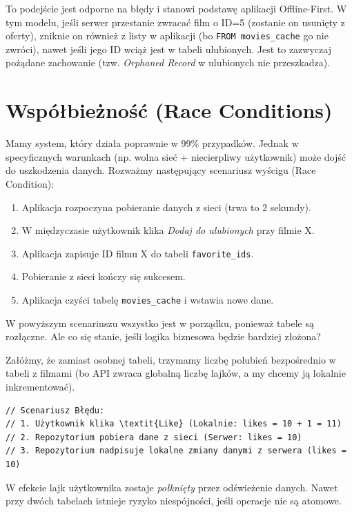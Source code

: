 To podejście jest odporne na błędy i stanowi podstawę aplikacji Offline-First. W tym modelu, jeśli serwer przestanie zwracać film o ID=5 (zostanie on usunięty z oferty), zniknie on również z listy w aplikacji (bo \texttt{FROM movies\_cache} go nie zwróci), nawet jeśli jego ID wciąż jest w tabeli ulubionych. Jest to zazwyczaj pożądane zachowanie (tzw. \textit{Orphaned Record} w ulubionych nie przeszkadza).

\section{Współbieżność (Race Conditions)}

Mamy system, który działa poprawnie w 99\% przypadków. Jednak w specyficznych warunkach (np. wolna sieć + niecierpliwy użytkownik) może dojść do uszkodzenia danych. Rozważmy następujący scenariusz wyścigu (Race Condition):

\begin{enumerate}
    \item Aplikacja rozpoczyna pobieranie danych z sieci (trwa to 2 sekundy).
    \item W międzyczasie użytkownik klika \textit{Dodaj do ulubionych} przy filmie X.
    \item Aplikacja zapisuje ID filmu X do tabeli \texttt{favorite\_ids}.
    \item Pobieranie z sieci kończy się sukcesem.
    \item Aplikacja czyści tabelę \texttt{movies\_cache} i wstawia nowe dane.
\end{enumerate}

W powyższym scenariuszu wszystko jest w porządku, ponieważ tabele są rozłączne. Ale co się stanie, jeśli logika biznesowa będzie bardziej złożona?

Załóżmy, że zamiast osobnej tabeli, trzymamy liczbę polubień bezpośrednio w tabeli z filmami (bo API zwraca globalną liczbę lajków, a my chcemy ją lokalnie inkrementować).

\begin{verbatim}
// Scenariusz Błędu:
// 1. Użytkownik klika \textit{Like} (Lokalnie: likes = 10 + 1 = 11)
// 2. Repozytorium pobiera dane z sieci (Serwer: likes = 10)
// 3. Repozytorium nadpisuje lokalne zmiany danymi z serwera (likes = 10)
\end{verbatim}

W efekcie lajk użytkownika zostaje \textit{połknięty} przez odświeżenie danych. Nawet przy dwóch tabelach istnieje ryzyko niespójności, jeśli operacje nie są atomowe.

